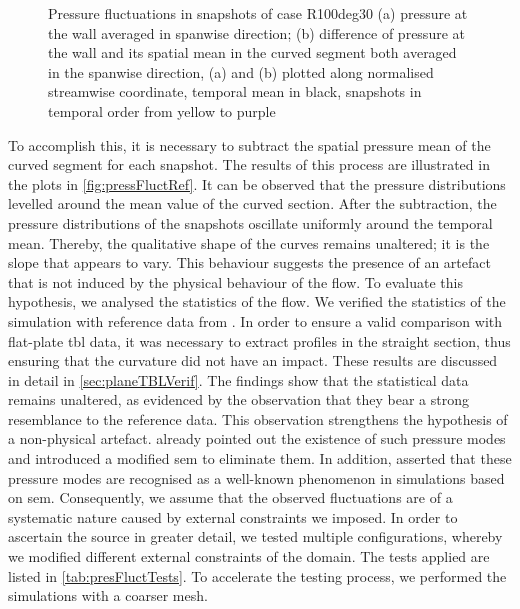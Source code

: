 \begin{figure}[h!]
\centering

\caption{Pressure fluctuations in snapshots of case R100deg30 (a) pressure at the wall averaged in spanwise direction; (b) difference of pressure at the wall and its spatial mean in the curved segment both averaged in the spanwise direction, (a) and (b) plotted along normalised streamwise coordinate, temporal mean in black, snapshots in temporal order from yellow to purple}
\label{fig:pressFluctRef}
\end{figure}


To accomplish this, it is necessary to subtract the spatial pressure mean of the curved segment for each snapshot. 
The results of this process are illustrated  in the plots in \autoref{fig:pressFluctRef}.
It can be observed that  the pressure distributions levelled around the mean value of the curved section.
After the subtraction, the pressure distributions of the snapshots oscillate uniformly around the temporal mean.
Thereby, the qualitative shape of the curves remains unaltered; it is the slope that appears to vary.
This behaviour suggests the presence of an  artefact that is not induced by the physical behaviour of the flow. 
To evaluate this hypothesis, we analysed the statistics of the flow.
We verified the statistics of the simulation with reference data from \citet{schlatter_assessment_2010}.
In order to ensure a valid comparison with flat-plate \acrshort{tbl} data, it was necessary to extract profiles in the straight section, thus ensuring that the curvature did not have an impact.
These results are discussed in detail in \autoref{sec:planeTBLVerif}.
The findings  show that  the statistical data remains unaltered, as evidenced by the observation that they bear a strong resemblance to the reference data.
This observation strengthens the hypothesis of a non-physical artefact.
\citet{maday_spectral_1989} already pointed out the existence of such pressure modes and introduced a modified \acrshort{sem} to eliminate them.
In addition, \citet{sabbah_filtering_2001}  asserted that  these pressure modes are recognised as a well-known phenomenon in simulations based on \acrshort{sem}.
Consequently,  we assume that the observed fluctuations are of a systematic nature caused by external constraints we imposed.
In order to ascertain the source in greater detail, we tested multiple configurations, whereby we modified different external  constraints of the domain.
The  tests applied  are listed in \autoref{tab:presFluctTests}.
To accelerate the testing process, we performed the simulations with a coarser mesh.

